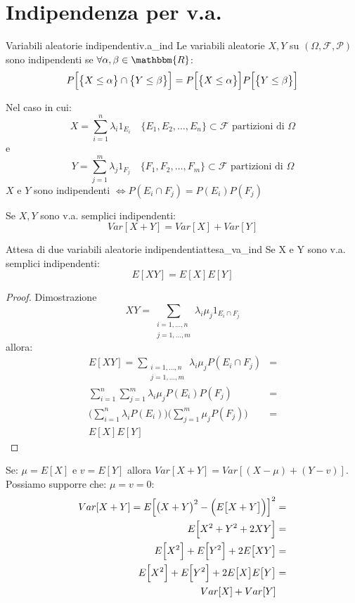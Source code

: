 \documentclass[12pt]{report}
\newcounter{theorem}
\newcounter{lemma}
\newcounter{definition}
\newcommand{\namerefl}[1]{%
	\bgroup
	\let\nmu\MakeLowercase
	\nameref{#1}\egroup}
\newcommand{\nmu}{}
\begin{document}
 	\section{Indipendenza per v.a.}
 	\begin{definition}{\nmu Variabili aleatorie indipendenti}{v.a_ind}
 		Le variabili aleatorie $X, Y$ su $(\Omega, \mathcal{F}, \mathcal{P})$ sono indipendenti se $\forall \alpha, \beta \in \mathbbm{R}$:
 		\[
 		P\Bigl[\bigl\{X \leq \alpha\bigr\} \cap \bigl\{Y \leq \beta\bigr\}\Bigr] = P\Bigl[\bigl\{X \leq \alpha\bigr\}\Bigr]P\Bigl[\bigl\{Y \leq \beta\bigr\}\Bigr]
 		\]
 	\end{definition}
 	Nel caso in cui:
 	\[
 	X = \sum_{i = 1}^{n}\lambda_i1_{E_i} \quad \{E_1, E_2, \dots, E_n\} \subset \mathcal{F} \text{ partizioni di } \Omega
 	\]
 	e
 	\[
 	Y = \sum_{j = 1}^{m}\lambda_j1_{F_j} \quad \{F_1, F_2, \dots, F_m\} \subset \mathcal{F} \text{ partizioni di } \Omega
 	\]
 	$X$ e $Y$ sono indipendenti $\iff P(E_i \cap F_j) = P(E_i)P(F_j)$
 	\begin{theorem}{}{}
 		Se $X, Y$ sono v.a. semplici indipendenti:
 		\[
 		Var[X + Y] = Var[X] + Var[Y]
 		\]
 	\end{theorem}
 	\begin{lemma}{\nmu Attesa di due variabili aleatorie indipendenti}{attesa_va_ind}
 		Se X e Y sono v.a. semplici indipendenti:
 		\[
 		E[XY] = E[X]E[Y]
 		\]
 	\end{lemma}
 	\begin{proof}{Dimostrazione \namerefl{lem:attesa_va_ind}}
 		\[
 		XY = \sum_{\substack{i=1,\dots, n \\ j = 1, \dots, m}}\lambda_i\mu_j1_{E_i \cap F_j}
 		\]
 		allora:
 		\begin{align*}
 		E[XY] = \sum_{\substack{i=1,\dots, n \\ j = 1, \dots, m}}\lambda_i\mu_jP(E_i \cap F_j) &= \\ \sum_{i = 1}^{n}\sum_{j = 1}^{m}\lambda_i\mu_jP(E_i)P(F_j) &= \\ \Bigg(\sum_{i = 1}^{n}\lambda_iP(E_i)\Bigg)\Bigg(\sum_{j = 1}^{m}\mu_jP(F_j)\Bigg) &= \\ E[X]E[Y]
 		\end{align*}
 	\end{proof}
 	Se: $\mu = E[X]$ e $v = E[Y]$ allora $Var[X + Y] = Var[(X - \mu) + (Y - v)]$. \\
 	Possiamo supporre che: $\mu = v = 0$:
 	\begin{align*}
 	Var[X + Y] = E\Bigl[\bigl(X + Y\bigr)^2 - \Bigl(E\bigl[X + Y\bigr]\Bigr)\Bigr]^2 &= \\
 	E\Bigl[X^2 + Y^2 + 2XY\Bigr] &= \\
 	E\Bigl[X^2\Bigr] + E\Bigl[Y^2\Bigr] + 2E\bigl[XY\bigr] &= \\
 	E\Bigl[X^2\Bigr] + E\Bigl[Y^2\Bigr] + 2E\bigl[X\bigr]E\bigl[Y\bigr] &= \\
 	Var[X] + Var[Y]
  	\end{align*}
\end{document}
